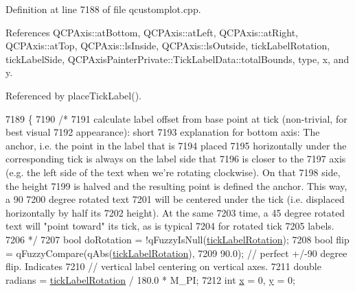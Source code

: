 Definition at line 7188 of file qcustomplot.\+cpp.



References Q\+C\+P\+Axis\+::at\+Bottom, Q\+C\+P\+Axis\+::at\+Left, Q\+C\+P\+Axis\+::at\+Right, Q\+C\+P\+Axis\+::at\+Top, Q\+C\+P\+Axis\+::ls\+Inside, Q\+C\+P\+Axis\+::ls\+Outside, tick\+Label\+Rotation, tick\+Label\+Side, Q\+C\+P\+Axis\+Painter\+Private\+::\+Tick\+Label\+Data\+::total\+Bounds, type, x, and y.



Referenced by place\+Tick\+Label().


\begin{DoxyCode}
7189                                           \{
7190   \textcolor{comment}{/*}
7191 \textcolor{comment}{    calculate label offset from base point at tick (non-trivial, for best visual}
7192 \textcolor{comment}{    appearance): short}
7193 \textcolor{comment}{    explanation for bottom axis: The anchor, i.e. the point in the label that is}
7194 \textcolor{comment}{    placed}
7195 \textcolor{comment}{    horizontally under the corresponding tick is always on the label side that}
7196 \textcolor{comment}{    is closer to the}
7197 \textcolor{comment}{    axis (e.g. the left side of the text when we're rotating clockwise). On that}
7198 \textcolor{comment}{    side, the height}
7199 \textcolor{comment}{    is halved and the resulting point is defined the anchor. This way, a 90}
7200 \textcolor{comment}{    degree rotated text}
7201 \textcolor{comment}{    will be centered under the tick (i.e. displaced horizontally by half its}
7202 \textcolor{comment}{    height). At the same}
7203 \textcolor{comment}{    time, a 45 degree rotated text will "point toward" its tick, as is typical}
7204 \textcolor{comment}{    for rotated tick}
7205 \textcolor{comment}{    labels.}
7206 \textcolor{comment}{  */}
7207   \textcolor{keywordtype}{bool} doRotation = !qFuzzyIsNull(\hyperlink{class_q_c_p_axis_painter_private_ae6ade9232a8e400924009e8edca94bac}{tickLabelRotation});
7208   \textcolor{keywordtype}{bool} flip = qFuzzyCompare(qAbs(\hyperlink{class_q_c_p_axis_painter_private_ae6ade9232a8e400924009e8edca94bac}{tickLabelRotation}),
7209                             90.0); \textcolor{comment}{// perfect +/-90 degree flip. Indicates}
7210                                    \textcolor{comment}{// vertical label centering on vertical axes.}
7211   \textcolor{keywordtype}{double} radians = \hyperlink{class_q_c_p_axis_painter_private_ae6ade9232a8e400924009e8edca94bac}{tickLabelRotation} / 180.0 * M\_PI;
7212   \textcolor{keywordtype}{int} \hyperlink{_comparision_pictures_2_createtest_image_8m_a9336ebf25087d91c818ee6e9ec29f8c1}{x} = 0, \hyperlink{_comparision_pictures_2_createtest_image_8m_a2fb1c5cf58867b5bbc9a1b145a86f3a0}{y} = 0;

\end{DoxyCode}
